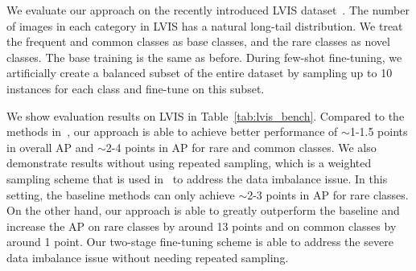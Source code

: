 
We evaluate our approach on the recently introduced LVIS dataset~\cite{gupta2019lvis}. The number of images in each category in LVIS has a natural long-tail distribution. We treat the frequent and common classes as base classes, and the rare classes as novel classes.
The base training is the same as before.
During few-shot fine-tuning, we artificially create a balanced subset of the entire dataset by sampling up to 10 instances for each class and fine-tune on this subset.

We show evaluation results on LVIS in Table~\ref{tab:lvis_bench}.
Compared to the methods in~\citet{gupta2019lvis}, our approach is able to achieve better performance of $\sim$1-1.5 points in overall AP and $\sim$2-4 points in AP for rare and common classes.
We also demonstrate results without using repeated sampling, which is a weighted sampling scheme that is used in~\citet{gupta2019lvis} to address the data imbalance issue.
In this setting, the baseline methods can only achieve $\sim$2-3 points in AP for rare classes.
On the other hand, our approach is able to greatly outperform the baseline and increase the AP on rare classes by around 13 points and on common classes by around 1 point.
Our two-stage fine-tuning scheme is able to address the severe data imbalance issue without needing repeated sampling.

